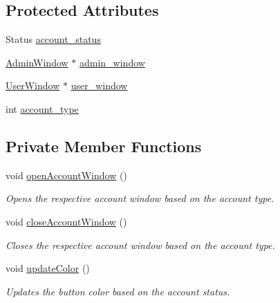 \subsection*{Protected Attributes}
\begin{DoxyCompactItemize}
\item 
Status \hyperlink{classScanButton_a22c7452ff6724ab7c1aa08f6af142ea7}{account\+\_\+status}
\item 
\hyperlink{classAdminWindow}{Admin\+Window} $\ast$ \hyperlink{classScanButton_a078d1a2a95e8f579fa163c6d903337aa}{admin\+\_\+window}
\item 
\hyperlink{classUserWindow}{User\+Window} $\ast$ \hyperlink{classScanButton_a5a84fdd77fd4aff624e54914019c711e}{user\+\_\+window}
\item 
int \hyperlink{classScanButton_a6b492c7a79ec5cf43b5b4f6f20aed636}{account\+\_\+type}
\end{DoxyCompactItemize}
\subsection*{Private Member Functions}
\begin{DoxyCompactItemize}
\item 
\mbox{\label{classScanButton_a54e1b03ed5db51ce94f30b55a472651d}} 
void \hyperlink{classScanButton_a54e1b03ed5db51ce94f30b55a472651d}{open\+Account\+Window} ()
\begin{DoxyCompactList}\small\item\em Opens the respective account window based on the account type. \end{DoxyCompactList}\item 
\mbox{\label{classScanButton_afe68603aa55c0d9b818ebf98b9df24aa}} 
void \hyperlink{classScanButton_afe68603aa55c0d9b818ebf98b9df24aa}{close\+Account\+Window} ()
\begin{DoxyCompactList}\small\item\em Closes the respective account window based on the account type. \end{DoxyCompactList}\item 
\mbox{\label{classScanButton_a425b36458139bda8abcb1a0a41fd2dc8}} 
void \hyperlink{classScanButton_a425b36458139bda8abcb1a0a41fd2dc8}{update\+Color} ()
\begin{DoxyCompactList}\small\item\em Updates the button color based on the account status. \end{DoxyCompactList}\end{DoxyCompactItemize}


